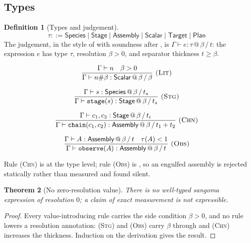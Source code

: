 \documentclass[11pt,twocolumn,a4paper]{article}
\newtheorem{theorem}{Theorem}[section]
\theoremstyle{definition}
\newtheorem{definition}[theorem]{Definition}
\theoremstyle{remark}
\newcommand{\flo}{\beta}
\newcommand{\thick}{t}
\begin{document}
\subsection{Types}

\begin{definition}[Types and judgement]
\label{def:types}
\[
  \tau ::= \textsf{Species} \mid \textsf{Stage} \mid \textsf{Assembly}
        \mid \textsf{Scalar} \mid \textsf{Target} \mid \textsf{Plan}
\]
The judgement, in the style of \citet{pierce2002types} with soundness after
\citet{wright1994syntactic}, is $\Gamma\vdash e:\tau\,@\,\flo\,/\,\thick$: the
expression $e$ has type $\tau$, resolution $\flo>0$, and separator thickness
$\thick\ge\flo$.
\end{definition}

\[
\frac{\Gamma \vdash n \quad \flo > 0}
     {\Gamma \vdash n\#\flo : \textsf{Scalar} \,@\, \flo \,/\, \flo}
\ \textsc{(Lit)}
\]

\[
\frac{\Gamma \vdash s : \textsf{Species} \,@\, \flo \,/\, \thick_s}
     {\Gamma \vdash \texttt{stage}(s) : \textsf{Stage} \,@\, \flo \,/\, \thick_s}
\ \textsc{(Stg)}
\]

\[
\frac{\Gamma \vdash c_1, c_2 : \textsf{Stage} \,@\, \flo \,/\, \thick_i}
     {\Gamma \vdash \texttt{chain}(c_1,c_2) :
      \textsf{Assembly} \,@\, \flo \,/\, \thick_1 + \thick_2}
\ \textsc{(Chn)}
\]

\[
\frac{\Gamma \vdash A : \textsf{Assembly} \,@\, \flo \,/\, \thick \quad
      \tau(A) < 1}
     {\Gamma \vdash \texttt{observe}(A) :
      \textsf{Assembly} \,@\, \flo \,/\, \thick}
\ \textsc{(Obs)}
\]

Rule \textsc{(Chn)} is  at the type level; rule
\textsc{(Obs)} is , so an engulfed assembly is rejected
statically rather than measured and found silent.

\begin{theorem}[No zero-resolution value]
\label{thm:no-zero}
There is no well-typed sangoma expression of resolution $0$; a claim of exact
measurement is not expressible.
\end{theorem}

\begin{proof}
Every value-introducing rule carries the side condition $\flo>0$, and no rule
lowers a resolution annotation: \textsc{(Stg)} and \textsc{(Obs)} carry $\flo$
through and \textsc{(Chn)} increases the thickness. Induction on the derivation
gives the result.
\end{proof}
\end{document}
